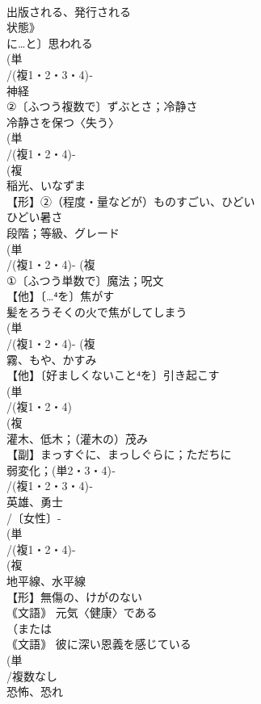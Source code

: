 \documentclass[8pt]{extreport}
\begin{document}
\begin{CJK}{UTF8}{min}
\\	出版される、発行される　
\\	状態》
\\	に…と〕思われる
\\	(単
\\	/(複1・2・3・4)‐
\\	神経 
\\	②〔ふつう複数で〕ずぶとさ；冷静さ 
\\	冷静さを保つ〈失う〉
\\	(単
\\	/(複1・2・4)-
\\	(複
\\	稲光、いなずま 
\\	【形】②（程度・量などが）ものすごい、ひどい 
\\	ひどい暑さ
\\	段階；等級、グレード
\\	(単
\\	/(複1・2・4)- (複
\\	①〔ふつう単数で〕魔法；呪文 
\\	【他】〔…⁴を〕焦がす 
\\	髪をろうそくの火で焦がしてしまう 
\\	(単
\\	/(複1・2・4)- (複
\\	霧、もや、かすみ 
\\	【他】〔好ましくないこと⁴を〕引き起こす 
\\	(単
\\	/(複1・2・4)
\\	(複
\\	灌木、低木；（灌木の）茂み 
\\	【副】まっすぐに、まっしぐらに；ただちに 
\\	弱変化；(単2・3・4)‐
\\	/(複1・2・3・4)‐
\\	英雄、勇士 
\\	/〔女性〕-
\\	(単
\\	/(複1・2・4)-
\\	(複
\\	地平線、水平線 
\\	【形】無傷の、けがのない 
\\	｟文語｠ 元気〈健康〉である
\\	（または
\\	｟文語｠ 彼に深い恩義を感じている
\\	(単
\\	/複数なし 
\\	恐怖、恐れ 

\end{CJK}
\end{document}
